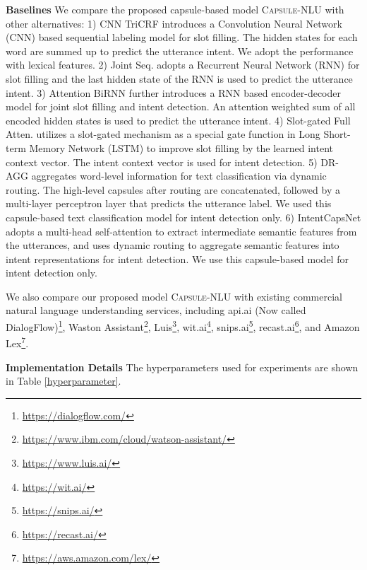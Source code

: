 \documentclass[11pt,a4paper,hyphens]{article}
\newcommand{\ModelName}{{\textsc{Capsule-NLU}}}
\begin{document}
\noindent\textbf{Baselines}
We compare the proposed capsule-based model {\ModelName} with other alternatives:
1) CNN TriCRF \citep{xu2013convolutional} introduces a Convolution Neural Network (CNN) based sequential labeling model for slot filling. The hidden states for each word are summed up to predict the utterance intent. We adopt the performance with lexical features.
2) Joint Seq. \citep{hakkani2016multi} adopts a Recurrent Neural Network (RNN) for slot filling and the last hidden state of the RNN is used to predict the utterance intent. 
3) Attention BiRNN \citep{liu2016attention} further introduces a RNN based encoder-decoder model for joint slot filling and intent detection. An attention weighted sum of all encoded hidden states is used to predict the utterance intent.
4) Slot-gated Full Atten. \citep{goo2018slot} utilizes a slot-gated mechanism as a special gate function in Long Short-term Memory Network (LSTM) to improve slot filling by the learned intent context vector. The intent context vector is used for intent detection.
5) DR-AGG \citep{gong2018information} aggregates word-level information for text classification via dynamic routing. The high-level capsules after routing are concatenated, followed by a multi-layer perceptron layer that predicts the utterance label. We used this capsule-based text classification model for intent detection only.
6) IntentCapsNet \citep{xia2018zero} adopts a multi-head self-attention to extract intermediate semantic features from the utterances, and uses dynamic routing to aggregate semantic features into intent representations for intent detection. We use this capsule-based model for intent detection only.

We also compare our proposed model {\ModelName} with existing commercial natural language understanding services, including api.ai (Now called DialogFlow)\footnote{\url{https://dialogflow.com/}}, Waston Assistant\footnote{\url{https://www.ibm.com/cloud/watson-assistant/}}, Luis\footnote{\url{https://www.luis.ai/}}, wit.ai\footnote{\url{https://wit.ai/}}, snips.ai\footnote{\url{https://snips.ai/}}, recast.ai\footnote{\url{https://recast.ai/}}, and Amazon Lex\footnote{\url{https://aws.amazon.com/lex/}}.

\noindent\textbf{Implementation Details}
The hyperparameters used for experiments are shown in Table \ref{hyperparameter}.
\end{document}
